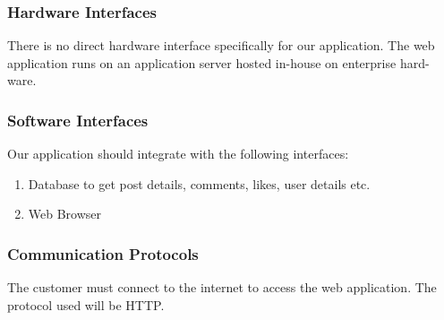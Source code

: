 \documentclass[12pt, letterpaper, twoside]{article}
\begin{document}
\subsubsection{Hardware Interfaces}
There is no direct hardware interface specifically for our application. The web
application runs on an application server hosted in-house on enterprise hard-
ware.
\subsubsection{Software Interfaces}
Our application should integrate with the following interfaces:
\begin{enumerate}
\item Database to get post details, comments, likes, user details etc.
\item Web Browser
\end{enumerate}
\subsubsection{Communication Protocols}
The customer must connect to the internet to access the web application. The
protocol used will be HTTP.
\end{document}
